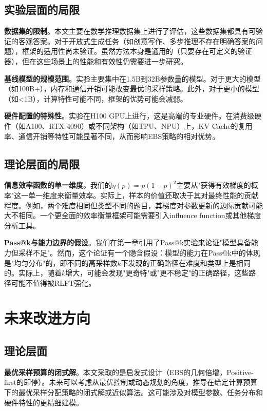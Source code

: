 \subsection{实验层面的局限}
\label{subsec:experiment_limitations}

\textbf{数据集的限制}。本文主要在数学推理数据集上进行了评估，这些数据集都具有可验证的客观答案。对于开放式生成任务（如创意写作、多步推理不存在明确答案的问题），框架的适用性尚未验证。虽然方法本身是通用的（只要存在可定义的验证器），但在这些场景上的性能和有效性仍需要进一步研究。

\textbf{基线模型的规模范围}。实验主要集中在1.5B到32B参数量的模型。对于更大的模型（如100B+），内存和通信开销可能改变最优的采样策略。此外，对于更小的模型（如<1B），计算特性可能不同，框架的优势可能会减弱。

\textbf{硬件配置的特殊性}。实验在H100 GPU上进行，这是高端的专业硬件。在消费级硬件（如A100、RTX 4090）或不同架构（如TPU、NPU）上，KV Cache的复用率、通信开销等特性可能显著不同，从而影响EBS策略的相对优势。

\subsection{理论层面的局限}
\label{subsec:theory_limitations}

\textbf{信息效率函数的单一维度}。我们的$\eta(p) = p(1-p)^2$主要从"获得有效梯度的概率"这一单一维度来衡量效率。实际上，样本的价值还取决于其对最终性能的贡献程度。例如，两个难度相同但类型不同的题目，其梯度对参数更新的边际贡献可能大不相同。一个更全面的效率衡量框架可能需要引入influence function或其他梯度分析工具。

\textbf{Pass@k与能力边界的假设}。我们在第一章引用了Pass@k实验来论证"模型具备能力但采样不足"。然而，这个论证有一个隐含假设：模型的能力在Pass@k中的体现是"均匀分布"的，即不同的高采样数$k$下发现的正确路径在难度和类型上是相同的。实际上，随着$k$增大，可能会发现"更奇特"或"更不稳定"的正确路径，这些路径可能不值得被RLFT强化。

\section{未来改进方向}
\label{sec:future_directions}

\subsection{理论层面}
\label{subsec:future_theory}

\textbf{最优采样预算的闭式解}。本文采取的是启发式设计（EBS的几何倍增，Positive-first的即停）。未来可以考虑从最优控制或动态规划的角度，推导在给定计算预算下的最优采样分配策略的闭式解或近似算法。这可能涉及对模型参数、任务分布和硬件特性的更精细建模。

